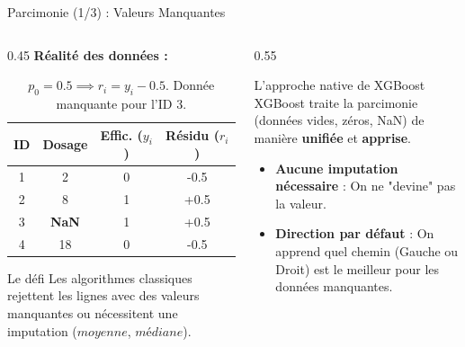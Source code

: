 \begin{frame}{Parcimonie (1/3) : Valeurs Manquantes}
    \begin{columns}[T]
        \begin{column}{0.45\textwidth}
            \textbf{Réalité des données :}
            \vspace{0.1cm}
            
            \begin{table}
                \centering
                \scriptsize
                \begin{tabular}{|c|c|c|c|}
                    \hline
                    \textbf{ID} & \textbf{Dosage} & \textbf{Effic.} ($y_i$) & \textbf{Résidu} ($r_i$) \\
                    \hline
                    1 & 2 & 0 & -0.5 \\
                    2 & 8 & 1 & +0.5 \\
                    3 & \textbf{NaN} & 1 & +0.5 \\
                    4 & 18 & 0 & -0.5 \\
                    \hline
                \end{tabular}
                \caption{\scriptsize $p_0=0.5 \implies r_i = y_i - 0.5$. Donnée manquante pour l'ID 3.}
            \end{table}
            
            \begin{alertblock}{Le défi}
                \scriptsize
                Les algorithmes classiques rejettent les lignes avec des valeurs manquantes ou nécessitent une imputation ($moyenne$, $médiane$).
            \end{alertblock}
        \end{column}
        
        \begin{column}{0.55\textwidth}
            \begin{block}{L'approche native de XGBoost}
                \small
                XGBoost traite la parcimonie (données vides, zéros, NaN) de manière \textbf{unifiée} et \textbf{apprise}.
                
                \vspace{0.2cm}
                \begin{itemize}
                    \item \textbf{Aucune imputation nécessaire} : On ne "devine" pas la valeur.
                    \item \textbf{Direction par défaut} : On apprend quel chemin (Gauche ou Droit) est le meilleur pour les données manquantes.
                \end{itemize}
            \end{block}
        \end{column}
    \end{columns}
\end{frame}

